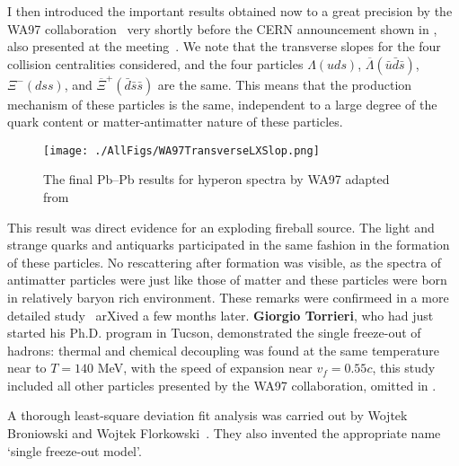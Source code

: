 I then introduced the important results obtained now to a great precision by the WA97 collaboration~\cite{Antinori:2000sb} very shortly before the CERN announcement shown in , also presented at the meeting~\cite{Antinori:2001qk}. We note that the transverse slopes for the four collision centralities considered, and the four particles $\Lambda(uds)$, $\overline\Lambda(\bar u\bar d\bar s)$, $\Xi^-(dss)$, and $\overline\Xi^+(\bar d\bar s\bar s)$ are the same. This means that the production mechanism of these particles is the same,  independent to a large degree of the quark content or  matter-antimatter nature of these particles. 

\begin{figure}\sidecaption
\centerline{
\texttt{[image: ./AllFigs/WA97TransverseLXSlop.png]}
}
\caption{The final Pb--Pb results for hyperon spectra by WA97 adapted from~\cite{Antinori:2000sb} 
}
\label{fig:WA97Spectra}
\end{figure}

This result was  direct evidence for an exploding fireball source. The  light and strange quarks and antiquarks participated in the same fashion in the formation of these particles. No rescattering after formation was visible, as the spectra of antimatter particles were just like those of matter and these particles were born in relatively baryon rich environment. These remarks were confirmeed in a more detailed study~\cite{Torrieri:2000xi} arXived a few months later. \textbf{Giorgio Torrieri}, who had just started his Ph.D. program in Tucson, demonstrated the single freeze-out of hadrons: thermal and chemical decoupling was found at the same temperature near to $T=140$ MeV, with the speed of expansion near $v_f=0.55c$, this study included all other particles presented by the WA97 collaboration, omitted  in .

A   thorough least-square deviation fit analysis  was carried out by Wojtek Broniowski and Wojtek Florkowski~\cite{Broniowski:2001uk}. They also invented the appropriate name \lq single freeze-out model\rq.




